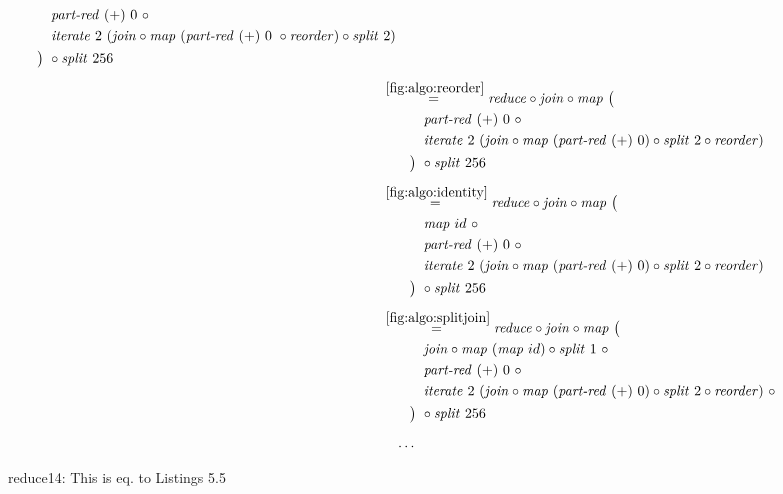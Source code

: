 \begin{figure*}[t]
\begin{align*}
\begin{aligned}
    &\qquad\quad\partRed\ (+)\ 0\ \circ\\
    &\qquad\quad\iterateN\ 2\ (\join \circ \map\ (\partRed\ (+)\ 0\ \circ \reorder) \circ \splitN\ 2)\\
    &\qquad\big)\ \circ \splitN\ 256
  \end{aligned}\\[.5em]
%
  &\hspace{-2em}\quad\begin{aligned}
    &\overset{\ref{fig:algo:reorder}}{=\hspace{.2em}}
      \reduce \circ \join \circ \map\ \big(\\
    &\qquad\quad\partRed\ (+)\ 0\ \circ\\
    &\qquad\quad\iterateN\ 2\ (\join \circ \map\ (\partRed\ (+)\ 0) \circ \splitN\ 2\circ \reorder)\\
    &\qquad\big)\ \circ \splitN\ 256
  \end{aligned}\\[.5em]
%
  &\hspace{-2em}\quad\begin{aligned}
    &\overset{\ref{fig:algo:identity}}{=\hspace{.2em}}
      \reduce \circ \join \circ \map\ \big(\\
    &\qquad\quad\map\ id\ \circ \\
    &\qquad\quad\partRed\ (+)\ 0\ \circ\\
    &\qquad\quad\iterateN\ 2\ (\join \circ \map\ (\partRed\ (+)\ 0) \circ \splitN\ 2\circ \reorder)\\
    &\qquad\big)\ \circ \splitN\ 256
  \end{aligned}\\[.5em]
%
  &\hspace{-2em}\quad\begin{aligned}
    &\overset{\ref{fig:algo:splitjoin}}{=\hspace{.2em}}
      \reduce \circ \join \circ \map\ \big(\\
    &\qquad\quad\join \circ \map\ (\map\ id) \circ \splitN\ 1\ \circ\\
    &\qquad\quad\partRed\ (+)\ 0\ \circ\\
    &\qquad\quad\iterateN\ 2\ (\join \circ \map\ (\partRed\ (+)\ 0) \circ \splitN\ 2\circ \reorder)\ \circ\\
    &\qquad\big)\ \circ \splitN\ 256
  \end{aligned}\\[.5em]
%
  &\ldots
\end{align*}
\caption{reduce14: This is eq. to Listings 5.5}
\end{figure*}

